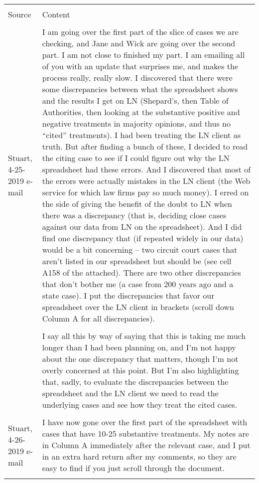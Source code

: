 \documentclass[10pt, letterpaper]{article}
\begin{document}
\begin{spacing}{1.0}
\begin{longtable}{p{1.5in}p{5in}}
    \hline\\[-8pt]
    Source & Content\\[2pt]
    \hline\\[-4pt]
    
    Stuart, 4-25-2019 e-mail & I am going over the first part of the slice of cases we are checking, and Jane and Wick are going over the second part. I am not close to finished my part. I am emailing all of you with an update that surprises me, and makes the process really, really slow. I discovered that there were some discrepancies between what the spreadsheet shows and the results I get on LN (Shepard’s, then Table of Authorities, then looking at the substantive positive and negative treatments in majority opinions, and thus no “cited” treatments). I had been treating the LN client as truth. But after finding a bunch of these, I decided to read the citing case to see if I could figure out why the LN spreadsheet had these errors. And I discovered that most of the errors were actually mistakes in the LN client (the Web service for which law firms pay so much money). I erred on the side of giving the benefit of the doubt to LN when there was a discrepancy (that is, deciding close cases against our data from LN on the spreadsheet). And I did find one discrepancy that (if repeated widely in our data) would be a bit concerning – two circuit court cases that aren’t listed in our spreadsheet but should be (see cell A158 of the attached). There are two other discrepancies that don’t bother me (a case from 200 years ago and a state case). I put the discrepancies that favor our spreadsheet over the LN client in brackets (scroll down Column A for all discrepancies). \\\\
    
    & I say all this by way of saying that this is taking me much longer than I had been planning on, and I’m not happy about the one discrepancy that matters, though I’m not overly concerned at this point. But I’m also highlighting that, sadly, to evaluate the discrepancies between the spreadsheet and the LN client we need to read the underlying cases and see how they treat the cited cases.\\\\
    
    
    
    
    Stuart, 4-26-2019 e-mail & I have now gone over the first part of the spreadsheet with cases that have 10-25 substantive treatments. My notes are in Column A immediately after the relevant case, and I put in an extra hard return after my comments, so they are easy to find if you just scroll through the document.\\\\
    

\end{longtable}
\end{spacing}
\end{document}
